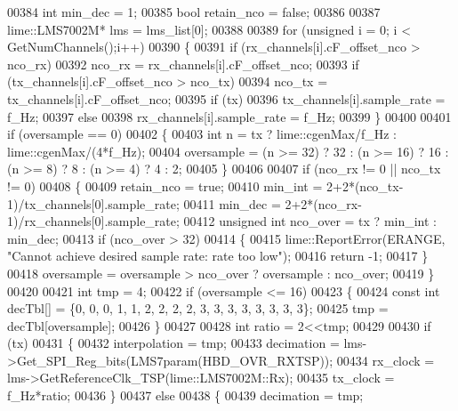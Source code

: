 \begin{DoxyCode}
00384     \textcolor{keywordtype}{int} min\_dec = 1;
00385     \textcolor{keywordtype}{bool} retain\_nco = \textcolor{keyword}{false};
00386 
00387     lime::LMS7002M* lms = lms_list[0];
00388 
00389     \textcolor{keywordflow}{for} (\textcolor{keywordtype}{unsigned} i = 0; i < GetNumChannels();i++)
00390     \{
00391         \textcolor{keywordflow}{if} (rx_channels[i].cF\_offset\_nco > nco\_rx)
00392             nco\_rx = rx_channels[i].cF\_offset\_nco;
00393         \textcolor{keywordflow}{if} (tx_channels[i].cF\_offset\_nco > nco\_tx)
00394             nco\_tx = tx_channels[i].cF\_offset\_nco;
00395         \textcolor{keywordflow}{if} (tx)
00396             tx_channels[i].sample\_rate = f\_Hz;
00397         \textcolor{keywordflow}{else}
00398             rx_channels[i].sample\_rate = f\_Hz;
00399     \}
00400 
00401     \textcolor{keywordflow}{if} (oversample == 0)
00402     \{
00403         \textcolor{keywordtype}{int} n = tx ? lime::cgenMax/f\_Hz : lime::cgenMax/(4*f\_Hz);
00404         oversample = (n >= 32) ? 32 : (n >= 16) ? 16 : (n >= 8) ? 8 : (n >= 4) ? 4 : 2;
00405     \}
00406 
00407     \textcolor{keywordflow}{if} (nco\_rx != 0 || nco\_tx != 0)
00408     \{
00409         retain\_nco = \textcolor{keyword}{true};
00410         min\_int = 2+2*(nco\_tx-1)/tx_channels[0].sample\_rate;
00411         min\_dec = 2+2*(nco\_rx-1)/rx_channels[0].sample\_rate;
00412         \textcolor{keywordtype}{unsigned} \textcolor{keywordtype}{int} nco\_over = tx ? min\_int : min\_dec;
00413         \textcolor{keywordflow}{if} (nco\_over > 32)
00414         \{
00415             lime::ReportError(ERANGE, \textcolor{stringliteral}{"Cannot achieve desired sample rate: rate too low"});
00416             \textcolor{keywordflow}{return} -1;
00417         \}
00418         oversample = oversample > nco\_over ? oversample : nco\_over;
00419     \}
00420 
00421     \textcolor{keywordtype}{int} tmp = 4;
00422     \textcolor{keywordflow}{if} (oversample <= 16)
00423     \{
00424         \textcolor{keyword}{const} \textcolor{keywordtype}{int} decTbl[] = \{0, 0, 0, 1, 1, 2, 2, 2, 2, 3, 3, 3, 3, 3, 3, 3, 3\};
00425         tmp = decTbl[oversample];
00426     \}
00427 
00428     \textcolor{keywordtype}{int} ratio = 2<<tmp;
00429 
00430     \textcolor{keywordflow}{if} (tx)
00431     \{
00432         interpolation = tmp;
00433         decimation = lms->Get_SPI_Reg_bits(LMS7param(HBD_OVR_RXTSP));
00434         rx\_clock = lms->GetReferenceClk_TSP(lime::LMS7002M::Rx);
00435         tx\_clock = f\_Hz*ratio;
00436     \}
00437     \textcolor{keywordflow}{else}
00438     \{
00439         decimation = tmp;

\end{DoxyCode}
